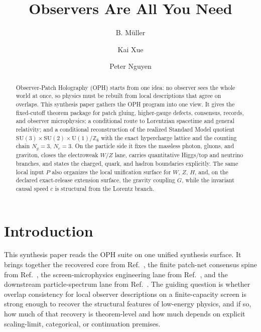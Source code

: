 \documentclass[11pt]{article}
\title{Observers Are All You Need}
\author{B. M\"uller \and Kai Xue \and Peter Nguyen}
\date{\OPHPaperReleaseDate}
\newcommand{\SU}{\mathrm{SU}}
\newcommand{\U}{\mathrm{U}}
\begin{document}
\maketitle
\OPHPaperReleaseBanner

\begin{abstract}
Observer-Patch Holography (OPH) starts from one idea: no observer sees the whole world at once, so physics must be rebuilt from local descriptions that agree on overlaps. This synthesis paper gathers the OPH program into one view. It gives the fixed-cutoff theorem package for patch gluing, higher-gauge defects, consensus, records, and observer microphysics; a conditional route to Lorentzian spacetime and general relativity; and a conditional reconstruction of the realized Standard Model quotient \(\SU(3)\times\SU(2)\times\U(1)/\mathbb Z_6\) with the exact hypercharge lattice and the counting chain \(N_g=3\), \(N_c=3\). On the particle side it fixes the massless photon, gluons, and graviton, closes the electroweak \(W/Z\) lane, carries quantitative Higgs/top and neutrino branches, and states the charged, quark, and hadron boundaries explicitly. The same local input \(P\) also organizes the local unification surface for \(W\), \(Z\), \(H\), and, on the declared exact-release extension surface, the gravity coupling \(G\), while the invariant causal speed \(c\) is structural from the Lorentz branch.
\end{abstract}

\tableofcontents
\newpage

\section{Introduction}

This synthesis paper reads the OPH suite on one unified synthesis surface. It brings
together the recovered core from Ref.~\cite{ophcompact}, the finite patch-net consensus spine from
Ref.~\cite{ophconsensus}, the screen-microphysics engineering lane from Ref.~\cite{ophmicrophysics},
and the downstream particle-spectrum lane from Ref.~\cite{ophparticles}. The guiding
question is whether overlap consistency for local observer descriptions on a finite-capacity screen
is strong enough to recover the structural features of low-energy physics, and if so, how much of
that recovery is theorem-level and how much depends on explicit scaling-limit,
categorical, or continuation premises.
\end{document}
